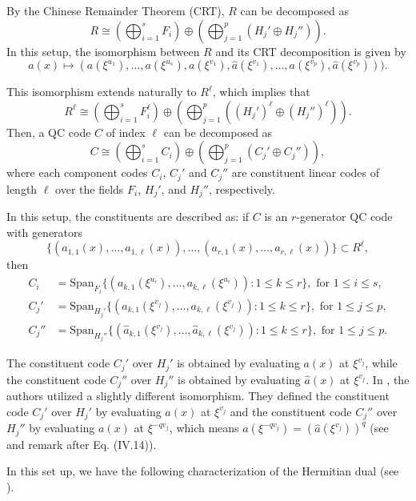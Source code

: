 \documentclass[a4paper,12pt]{article}
\begin{document}
By the Chinese Remainder Theorem (CRT), $R$ can be decomposed as
$$
R \cong \left(\bigoplus_{i=1}^{s} F_i \right) 
\oplus
\left(\bigoplus_{j=1}^{p} \left( H_j'
\oplus  H_j'' \right) \right).
$$ 
In this setup, the isomorphism between $R$ and its CRT decomposition is given by 
\[
a(x) \mapsto \left(a(\xi^{u_1}), \dots, a(\xi^{u_s}),a(\xi^{v_1}),\hat{a}(\xi^{v_1}), \dots, a(\xi^{v_p}),\hat{a}(\xi^{v_p})\right)). 
\]


This isomorphism extends naturally to  $R^\ell$, which implies that
$$
R^\ell \cong \left(\bigoplus_{i=1}^{s} F_i^\ell \right) 
\oplus
\left(\bigoplus_{j=1}^{p} \left( (H_j')^\ell
\oplus  (H_j'')^\ell  \right) \right).
$$ 
Then, a QC code $C$ of index $\ell$ can be  decomposed as 
\begin{equation} \label{crtCH}
	C \cong \left(\bigoplus_{i=1}^{s} C_i \right) 
	\oplus
	\left(\bigoplus_{j=1}^{p} \left(  C_j' 
	\oplus   C_j''   \right) \right), 
\end{equation} 
where each component codes $C_i$, $C_j'$ and $C_j''$ are constituent linear codes of length $\ell$ over the fields $F_i$,  $H_j'$, and $H_j''$, respectively.

In this setup, the constituents are described as: if $ C$ is an $r$-generator QC code with generators
\[
\{ (a_{1,1}(x),\dots ,a_{1,\ell}(x)) ,\dots, (a_{r,1}(x),\dots,a_{r,\ell} (x) ) \} \subset R^\ell,
\]
then 
\begin{align*}
	C_i &= \text{Span}_{F_i} \{ (a_{k,1}(\xi^{u_i}),\dots ,a_{k,\ell}(\xi^{u_i})) : 1 \le k \le r \}, \text{ for } 1 \le i \le s, \\
	C_j' &= \text{Span}_{H_j'} \{ (a_{k,1}(\xi^{v_j}),\dots ,a_{k,\ell}(\xi^{v_j})) : 1 \le k \le r \}, \text{ for } 1 \le j \le p, \\
	C_j'' &= \text{Span}_{H_j''} \{ (\hat{a}_{k,1}(\xi^{v_j}),\dots ,\hat{a}_{k,\ell}(\xi^{v_j})) : 1 \le k \le r \}, \text{ for } 1 \le j \le p.
\end{align*}







\begin{remark} 
The constituent code $C_j'$ over $H_j'$ is obtained by evaluating $a(x)$ at $\xi^{v_j}$, while the constituent  code $C_j''$ over $H_j''$ is obtained by evaluating $\hat{a}(x)$ at $\xi^{v_j}$. 
In \cite{ezerman2025}, the authors utilized a slightly different isomorphism. 
They defined the constituent code $C_j'$ over $H_j'$  by evaluating $a(x)$ at $\xi^{v_j}$ and the constituent  code $C_j''$ over $H_j''$  by evaluating $a(x)$ at $\xi^{-qv_j}$, which means 
$a(\xi^{-qv_j}) = (\hat{a}(\xi^{v_j} ))^q$ 
(see \cite[Eq. (IV.10)]{ezerman2025} and remark after Eq. (IV.14)).
\end{remark}
In this set up, we have the following characterization of the Hermitian dual (see \cite{ezerman2025,lv2019}).
\end{document}
